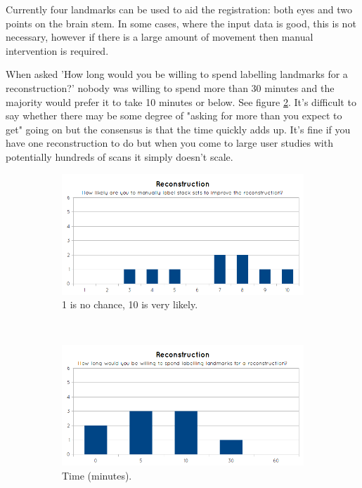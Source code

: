 Currently four landmarks can be used to aid the registration: both eyes and two points on the brain stem. In some cases, where the input data is good, this is not necessary, however if there is a large amount of movement then manual intervention is required.

When asked 'How long would you be willing to spend labelling landmarks for a reconstruction?' nobody was willing to spend more than 30 minutes and the majority would prefer it to take 10 minutes or below. See figure \ref{fig:graph_reconstruction_3}. It's difficult to say whether there may be some degree of "asking for more than you expect to get" going on but the consensus is that the time quickly adds up. It's fine if you have one reconstruction to do but when you come to large user studies with potentially hundreds of scans it simply doesn't scale.

\begin{figure}[H]
  \centering
  \begin{subfigure}[b]{0.5\textwidth}
    \includegraphics[width=\textwidth]{images/evaluation/graph_reconstruction_2.png}
    \caption{1 is no chance, 10 is very likely.}
    \label{fig:graph_reconstruction_2}
  \end{subfigure}%
  ~ %
  \begin{subfigure}[b]{0.5\textwidth}
    \includegraphics[width=\textwidth]{images/evaluation/graph_reconstruction_3.png}
    \caption{Time (minutes).}
    \label{fig:graph_reconstruction_3}
  \end{subfigure}
  \caption{}\label{fig:graph_reconstruction23}
\end{figure}

